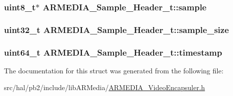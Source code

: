 \subsubsection[{\texorpdfstring{sample}{sample}}]{\setlength{\rightskip}{0pt plus 5cm}uint8\+\_\+t$\ast$ A\+R\+M\+E\+D\+I\+A\+\_\+\+Sample\+\_\+\+Header\+\_\+t\+::sample}\hypertarget{struct_a_r_m_e_d_i_a___sample___header__t_a295bfc73ed5fa7298db83dac4821889a}{}\label{struct_a_r_m_e_d_i_a___sample___header__t_a295bfc73ed5fa7298db83dac4821889a}
\subsubsection[{\texorpdfstring{sample\+\_\+size}{sample_size}}]{\setlength{\rightskip}{0pt plus 5cm}uint32\+\_\+t A\+R\+M\+E\+D\+I\+A\+\_\+\+Sample\+\_\+\+Header\+\_\+t\+::sample\+\_\+size}\hypertarget{struct_a_r_m_e_d_i_a___sample___header__t_a7a12d98433c1fd518f2ce040cf0dd595}{}\label{struct_a_r_m_e_d_i_a___sample___header__t_a7a12d98433c1fd518f2ce040cf0dd595}
\subsubsection[{\texorpdfstring{timestamp}{timestamp}}]{\setlength{\rightskip}{0pt plus 5cm}uint64\+\_\+t A\+R\+M\+E\+D\+I\+A\+\_\+\+Sample\+\_\+\+Header\+\_\+t\+::timestamp}\hypertarget{struct_a_r_m_e_d_i_a___sample___header__t_a8f6d90278030e89cc27d23aeaa58e542}{}\label{struct_a_r_m_e_d_i_a___sample___header__t_a8f6d90278030e89cc27d23aeaa58e542}


The documentation for this struct was generated from the following file\+:\begin{DoxyCompactItemize}
\item 
src/hal/pb2/include/lib\+A\+R\+Media/\hyperlink{_a_r_m_e_d_i_a___video_encapsuler_8h}{A\+R\+M\+E\+D\+I\+A\+\_\+\+Video\+Encapsuler.\+h}\end{DoxyCompactItemize}
